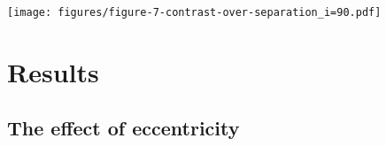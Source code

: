 \documentclass[
    usenatbib,
]{mnras}
\newcommand{\todo}[1]{\textcolor{red}{[#1]}}
\newcommand{\timmy}[1]{\textcolor{red}{[\textbf{Timmy:} #1]}} %
\newcommand{\IWA}{\ensuremath{\mathrm{IWA}}}
\newcommand{\hwo}{HabWorlds}
\begin{document}
\begin{figure*}%
   \centering
   \texttt{[image: figures/figure-7-contrast-over-separation\_i=90.pdf]}
   \caption{
    The contrast (Eq.~\ref{eq:contrast}) and orbital separation 
    of an Earth-like planet with an ocean surface and patchy clouds 
    along its orbit with an assumed inclination angle $i$ of \qty{90}{\degree} around $\alpha$~Cen~A, $\epsilon$~Eri, and Lalande~21185.
    The solid, black line indicates the contrast in unpolarized light, 
    with the contrast at quadrature marked by the black dot.
    The polarized component is indicated by the coloured dots, with the colour representing the phase angle from quadrature.
    The light grey dots show the contrasts at quadrature of the other targets in the star list, and the dashed lines indicate $1$, $2$ and $3$ times the \IWA{} for \hwo.
    }
    \label{fig:contrasts}
\end{figure*}

\section{Results}
\label{sec:3}



\subsection{The effect of eccentricity}
\label{sec:result_eccentricity}
\end{document}
